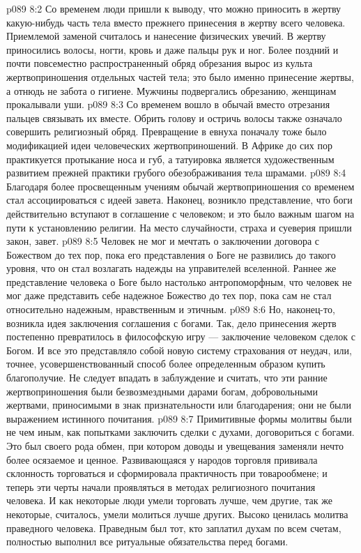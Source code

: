 \vs p089 8:2 Со временем люди пришли к выводу, что можно приносить в жертву какую\hyp{}нибудь часть тела вместо прежнего принесения в жертву всего человека. Приемлемой заменой считалось и нанесение физических увечий. В жертву приносились волосы, ногти, кровь и даже пальцы рук и ног. Более поздний и почти повсеместно распространенный обряд обрезания вырос из культа жертвоприношения отдельных частей тела; это было именно принесение жертвы, а отнюдь не забота о гигиене. Мужчины подвергались обрезанию, женщинам прокалывали уши.
\vs p089 8:3 Со временем вошло в обычай вместо отрезания пальцев связывать их вместе. Обрить голову и остричь волосы также означало совершить религиозный обряд. Превращение в евнуха поначалу тоже было модификацией идеи человеческих жертвоприношений. В Африке до сих пор практикуется протыкание носа и губ, а татуировка является художественным развитием прежней практики грубого обезображивания тела шрамами.
\vs p089 8:4 \pc Благодаря более просвещенным учениям обычай жертвоприношения со временем стал ассоциироваться с идеей завета. Наконец, возникло представление, что боги действительно вступают в соглашение с человеком; и это было важным шагом на пути к установлению религии. На место случайности, страха и суеверия пришли закон, завет.
\vs p089 8:5 Человек не мог и мечтать о заключении договора с Божеством до тех пор, пока его представления о Боге не развились до такого уровня, что он стал возлагать надежды на управителей вселенной. Раннее же представление человека о Боге было настолько антропоморфным, что человек не мог даже представить себе надежное Божество до тех пор, пока сам не стал относительно надежным, нравственным и этичным.
\vs p089 8:6 Но, наконец\hyp{}то, возникла идея заключения соглашения с богами.  Так, дело принесения жертв постепенно превратилось в философскую игру --- заключение человеком сделок с Богом. И все это представляло собой новую систему страхования от неудач, или, точнее, усовершенствованный способ более определенным образом купить благополучие. Не следует впадать в заблуждение и считать, что эти ранние жертвоприношения были безвозмездными дарами богам, добровольными жертвами, приносимыми в знак признательности или благодарения; они не были выражением истинного почитания.
\vs p089 8:7 \pc Примитивные формы молитвы были не чем иным, как попытками заключить сделки с духами, договориться с богами. Это был своего рода обмен, при котором доводы и увещевания заменяли нечто более осязаемое и ценное. Развивающаяся у народов торговля прививала склонность торговаться и сформировала практичность при товарообмене; и теперь эти черты начали проявляться в методах религиозного почитания человека. И как некоторые люди умели торговать лучше, чем другие, так же некоторые, считалось, умели молиться лучше других. Высоко ценилась молитва праведного человека. Праведным был тот, кто заплатил духам по всем счетам, полностью выполнил все ритуальные обязательства перед богами.
